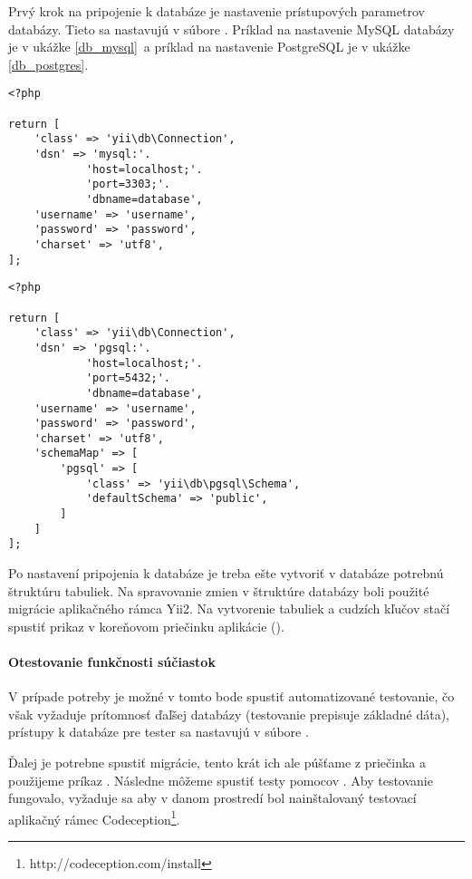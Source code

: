 Prvý krok na pripojenie k databáze je nastavenie prístupových parametrov databázy.
Tieto sa nastavujú v súbore . Príklad na nastavenie MySQL databázy
je v ukážke \ref{db_mysql} a príklad na nastavenie PostgreSQL je v ukážke \ref{db_postgres}.

\begin{lstlisting}[label=db_mysql,caption=Príklad nastavenia databázy MySQL]
<?php

return [
    'class' => 'yii\db\Connection',
    'dsn' => 'mysql:'.
            'host=localhost;'.
            'port=3303;'.
            'dbname=database',
    'username' => 'username',
    'password' => 'password',
    'charset' => 'utf8',
];
\end{lstlisting}

\begin{lstlisting}[label=db_postgres,caption=Príklad nastavenia databázy PostgreSQL]
<?php

return [
    'class' => 'yii\db\Connection',
    'dsn' => 'pgsql:'.
            'host=localhost;'.
            'port=5432;'.
            'dbname=database',
    'username' => 'username',
    'password' => 'password',
    'charset' => 'utf8',
    'schemaMap' => [
        'pgsql' => [
            'class' => 'yii\db\pgsql\Schema',
            'defaultSchema' => 'public',
        ]
    ]
];
\end{lstlisting}

Po nastavení pripojenia k databáze je treba ešte vytvoriť v databáze potrebnú štruktúru tabuliek.
Na spravovanie zmien v štruktúre databázy boli použité migrácie aplikačného rámca Yii2. 
Na vytvorenie tabuliek a cudzích kľučov stačí spustiť prikaz 
v koreňovom priečinku aplikácie ().

\paragraph{Otestovanie funkčnosti súčiastok}

V prípade potreby je možné v tomto bode spustiť automatizované testovanie, čo však vyžaduje 
prítomnosť ďaľšej databázy (testovanie prepisuje základné dáta), prístupy k databáze pre 
tester sa nastavujú v súbore .

Ďalej je potrebne spustiť migrácie, tento krát ich ale púšťame z priečinka 
a použijeme príkaz . Následne môžeme spustiť 
testy pomocov . Aby testovanie fungovalo, vyžaduje sa aby v danom
prostredí bol nainštalovaný testovací aplikačný rámec
Codeception\footnote{http://codeception.com/install}.


